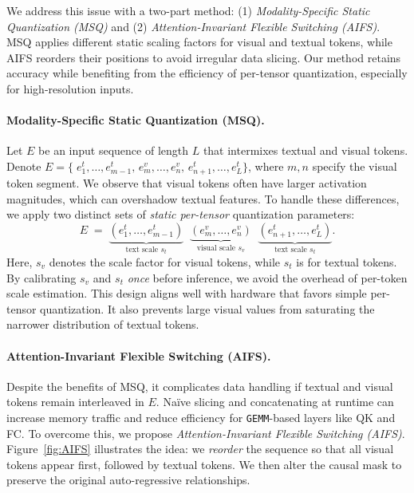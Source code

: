We address this issue with a two-part method:
(1) \emph{Modality-Specific Static Quantization (MSQ)} and
(2) \emph{Attention-Invariant Flexible Switching (AIFS)}.
MSQ applies different static scaling factors for visual and textual tokens, while AIFS reorders their positions to avoid irregular data slicing. Our method retains accuracy while benefiting from the efficiency of per-tensor quantization, especially for high-resolution inputs.

\vspace{1mm}
\label{MSQ}
\paragraph{Modality-Specific Static Quantization (MSQ).}
Let $E$ be an input sequence of length $L$ that intermixes textual and visual tokens. Denote $E = \{\;e^t_1, \dots, e^t_{m-1},\, e^v_m, \dots, e^v_n,\, e^t_{n+1}, \dots, e^t_L\}$, where $m,n$ specify the visual token segment. We observe that visual tokens often have larger activation magnitudes, which can overshadow textual features. To handle these differences, we apply two distinct sets of \emph{static per-tensor} quantization parameters:  
\begin{equation}
\label{eq:ms-ptq}
    E \;=\;
    \underbrace{(e^t_1, \dots, e^t_{m-1})}_{\textstyle \text{text scale } s_{t}}
    \;\;\underbrace{(e^v_m, \dots, e^v_n)}_{\textstyle \text{visual scale } s_{v}}
    \;\;\underbrace{(e^t_{n+1}, \dots, e^t_L)}_{\textstyle \text{text scale } s_{t}}.
\end{equation}
Here, $s_{v}$ denotes the scale factor for visual tokens, while $s_{t}$ is for textual tokens. By calibrating $s_{v}$ and $s_{t}$ \emph{once} before inference, we avoid the overhead of per-token scale estimation. This design aligns well with hardware that favors simple per-tensor quantization. It also prevents large visual values from saturating the narrower distribution of textual tokens.

\vspace{1mm}
\label{AIFS}
\paragraph{Attention-Invariant Flexible Switching (AIFS).}
Despite the benefits of MSQ, it complicates data handling if textual and visual tokens remain interleaved in $E$. Na\"ive slicing and concatenating at runtime can increase memory traffic and reduce efficiency for \texttt{GEMM}-based layers like QK and FC. To overcome this, we propose \emph{Attention-Invariant Flexible Switching (AIFS)}. Figure~\ref{fig:AIFS} illustrates the idea: 
we \emph{reorder} the sequence so that all visual tokens appear first, followed by textual tokens. We then alter the causal mask to preserve the original auto-regressive relationships.



